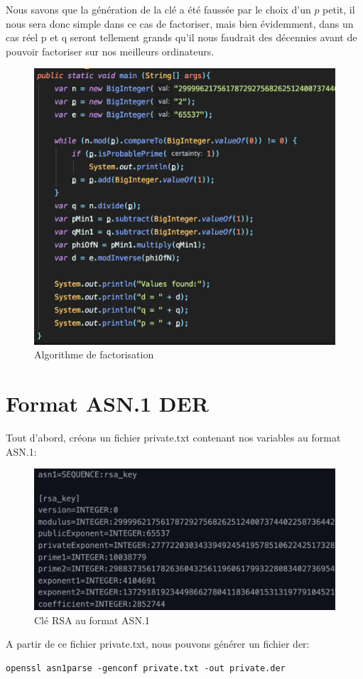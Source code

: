 \documentclass[12pt, oneside]{article}
\begin{document}
Nous savons que la génération de la clé a été faussée par le choix d'un \(p\) petit, il nous sera donc simple dans ce cas de factoriser, mais bien évidemment, dans un cas réel p et q seront tellement grands qu'il nous faudrait des décennies avant de pouvoir factoriser sur nos meilleurs ordinateurs. 
\begin{figure}[ht]
\centering
\includegraphics[scale=0.5]{algo}
\caption{Algorithme de factorisation}
\end{figure}

\section{Format ASN.1 DER}
Tout d'abord, créons un fichier private.txt contenant nos variables au format ASN.1: 
\begin{figure}[ht]
\centering
\includegraphics[scale=0.5]{der}
\caption{Clé RSA au format ASN.1}
\end{figure}
A partir de ce fichier private.txt, nous pouvons générer un fichier der:
\begin{verbatim}
openssl asn1parse -genconf private.txt -out private.der
\end{verbatim}
\end{document}
